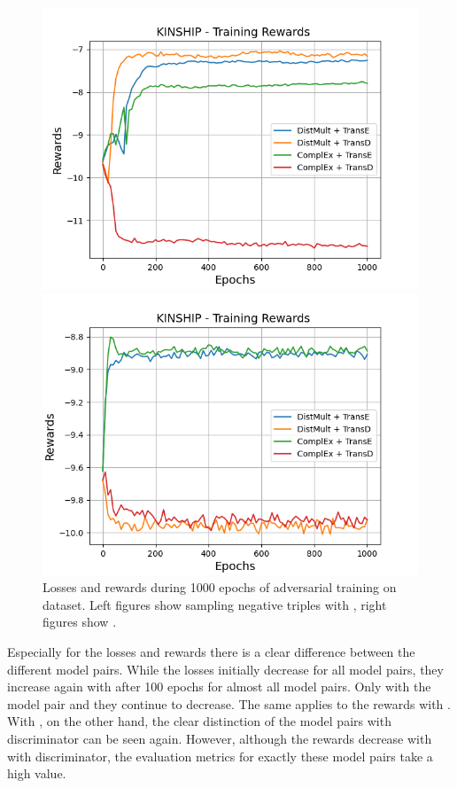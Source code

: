 \begin{figure}[H]
    \begin{minipage}{.5\textwidth}
      \centering
      \includegraphics[width=0.9\linewidth]{figures/results/gan_train/not_pretrained/uncertainty/max/entropy/kinship/1k_epochs/uncertainty_kinship_rew.png}
    \end{minipage}%
    \begin{minipage}{.5\textwidth}
      \centering
      \includegraphics[width=0.9\linewidth]{figures/results/gan_train/not_pretrained/uncertainty/max_distribution/entropy/kinship/1k_epochs/uncertainty_kinship_rew.png}
    \end{minipage}%
    \caption{Losses and rewards during 1000 epochs of adversarial training on \kinship dataset. 
    Left figures show sampling negative triples with \usmax, right figures show \ussoftmax.}
    \label{fig:advtrain_kinship_usmax_ussoftmax_losses_rewards}
\end{figure}
Especially for the losses and rewards there is a clear difference between the different model pairs.
While the losses initially decrease for all model pairs, they increase again with \usmax after 100 epochs for almost all model pairs.
Only with the model pair \complex and \distmult they continue to decrease.
The same applies to the rewards with \usmax.
With \ussoftmax, on the other hand, the clear distinction of the model pairs with \transd discriminator can be seen again. 
However, although the rewards decrease with \ussoftmax with \transd discriminator, the evaluation metrics for exactly these model pairs take a high value.